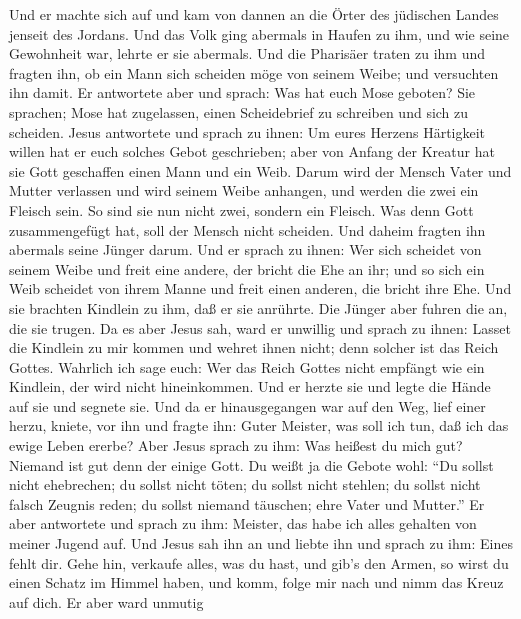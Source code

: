  Und er machte sich auf und kam von dannen an die Örter des
jüdischen Landes jenseit des Jordans. Und das Volk ging abermals in
Haufen zu ihm, und wie seine Gewohnheit war, lehrte er sie abermals.
 Und die Pharisäer traten zu ihm und fragten ihn, ob ein
Mann sich scheiden möge von seinem Weibe; und versuchten ihn damit.
 Er antwortete aber und sprach: Was hat euch Mose geboten?
 Sie sprachen; Mose hat zugelassen, einen Scheidebrief zu
schreiben und sich zu scheiden.  Jesus antwortete und sprach
zu ihnen: Um eures Herzens Härtigkeit willen hat er euch solches Gebot
geschrieben;  aber von Anfang der Kreatur hat sie Gott
geschaffen einen Mann und ein Weib.  Darum wird der Mensch
Vater und Mutter verlassen und wird seinem Weibe anhangen, 
und werden die zwei ein Fleisch sein. So sind sie nun nicht zwei,
sondern ein Fleisch.  Was denn Gott zusammengefügt hat, soll
der Mensch nicht scheiden.  Und daheim fragten ihn abermals
seine Jünger darum.  Und er sprach zu ihnen: Wer sich
scheidet von seinem Weibe und freit eine andere, der bricht die Ehe an
ihr;  und so sich ein Weib scheidet von ihrem Manne und
freit einen anderen, die bricht ihre Ehe.  Und sie brachten
Kindlein zu ihm, daß er sie anrührte. Die Jünger aber fuhren die an, die
sie trugen.  Da es aber Jesus sah, ward er unwillig und
sprach zu ihnen: Lasset die Kindlein zu mir kommen und wehret ihnen
nicht; denn solcher ist das Reich Gottes.  Wahrlich ich
sage euch: Wer das Reich Gottes nicht empfängt wie ein Kindlein, der
wird nicht hineinkommen.  Und er herzte sie und legte die
Hände auf sie und segnete sie.  Und da er hinausgegangen
war auf den Weg, lief einer herzu, kniete, vor ihn und fragte ihn: Guter
Meister, was soll ich tun, daß ich das ewige Leben ererbe? 
Aber Jesus sprach zu ihm: Was heißest du mich gut? Niemand ist gut denn
der einige Gott.  Du weißt ja die Gebote wohl: ``Du sollst
nicht ehebrechen; du sollst nicht töten; du sollst nicht stehlen; du
sollst nicht falsch Zeugnis reden; du sollst niemand täuschen; ehre
Vater und Mutter.''  Er aber antwortete und sprach zu ihm:
Meister, das habe ich alles gehalten von meiner Jugend auf.
 Und Jesus sah ihn an und liebte ihn und sprach zu ihm:
Eines fehlt dir. Gehe hin, verkaufe alles, was du hast, und gib's den
Armen, so wirst du einen Schatz im Himmel haben, und komm, folge mir
nach und nimm das Kreuz auf dich.  Er aber ward unmutig
